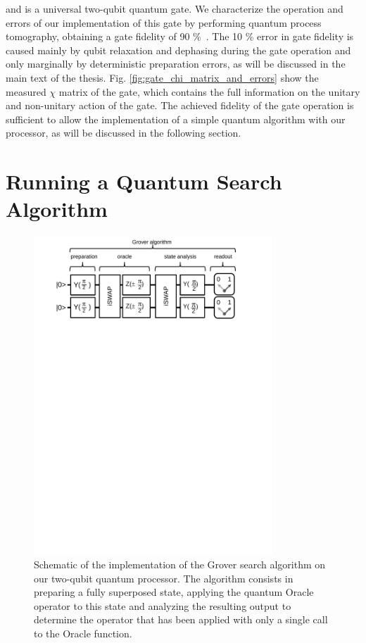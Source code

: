 and is a universal two-qubit quantum gate. We characterize the operation and errors of our implementation of this gate by performing quantum process tomography, obtaining a gate fidelity of 90 \%\ . The 10 \% error in gate fidelity is caused mainly by qubit relaxation and dephasing during the gate operation and only marginally by deterministic preparation errors, as will be discussed in the main text of the thesis. Fig. \ref{fig:gate_chi_matrix_and_errors} show the measured $\chi$ matrix of the gate, which contains the full information on the unitary and non-unitary action of the gate. The achieved fidelity of the gate operation is sufficient to allow the implementation of a simple quantum algorithm with our processor, as will be discussed in the following section.
 
\section{Running a Quantum Search Algorithm}

\begin{figure}[ht!]
	\centering
		\includegraphics[width=0.8\textwidth]{./material/papers/grover/figures/grover_algorithm_schematic}
	\caption[Schematic of the implementation of the Grover search algorithm]{Schematic of the implementation of the Grover search algorithm on our two-qubit quantum processor. The algorithm consists in preparing a fully superposed state, applying the quantum Oracle operator to this state and analyzing the resulting output to determine the operator that has been applied with only a single call to the Oracle function.} 
	\label{fig:grover_algorithm_schematic}
\end{figure}

